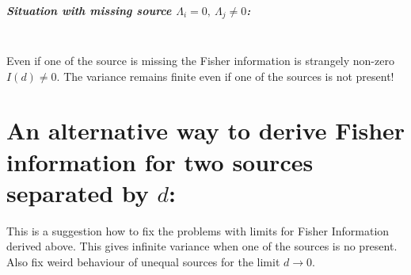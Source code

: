 \subparagraph*{Situation with missing source $\Lambda_i=0,\ \Lambda_j\neq0$:}\ \\
Even if one of the source is missing the Fisher information is strangely non-zero $I(d)\neq0$. The variance remains finite even if one of the sources is not present!


\section{An alternative way to derive Fisher information for two sources separated by $d$:}
\label{sec:Appendix FI alternative}
This is a suggestion how to fix the problems with limits for Fisher Information derived above. This gives infinite variance when one of the sources is no present. Also fix weird behaviour of unequal sources for the limit $d\rightarrow0$. 

